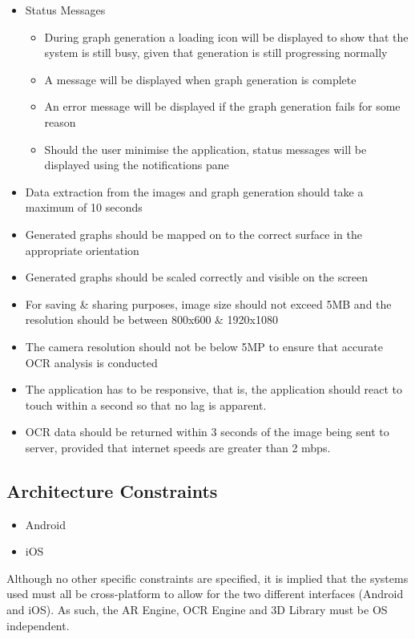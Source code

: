 \documentclass[a4paper,12pt]{article}
\begin{document}
\begin{itemize}
	\item Status Messages
		\begin{itemize}
			\item During graph generation a loading icon will be displayed to show that the system is still busy, given that generation is still progressing normally
			\item A message will be displayed when graph generation is complete
			\item An error message will be displayed if the graph generation fails for some reason
			\item Should the user minimise the application, status messages will be displayed using the notifications pane
		\end{itemize}
		
	\item Data extraction from the images and graph generation should take a maximum of 10 seconds
	\item Generated graphs should be mapped on to the correct surface in the appropriate orientation
	\item Generated graphs should be scaled correctly and visible on the screen
\item For saving \& sharing purposes, image size should not exceed 5MB and the  resolution should be between 800x600 \& 1920x1080
	\item The camera resolution should not be below 5MP to ensure that accurate OCR analysis is conducted
	\item The application has to be responsive, that is, the application should react to touch within a second so that no lag is apparent.
	\item OCR data should be returned within 3 seconds of the image being sent to server, provided that internet speeds are greater than 2 mbps.
\end{itemize}

\subsection{Architecture Constraints}
\begin{itemize}
	\item Android
	\item iOS
\end{itemize}
Although no other specific constraints are specified, it is implied that the systems used must all be cross-platform to allow for the two different interfaces (Android and iOS). As such, the AR Engine, OCR Engine and 3D Library must be OS independent.
\end{document}
